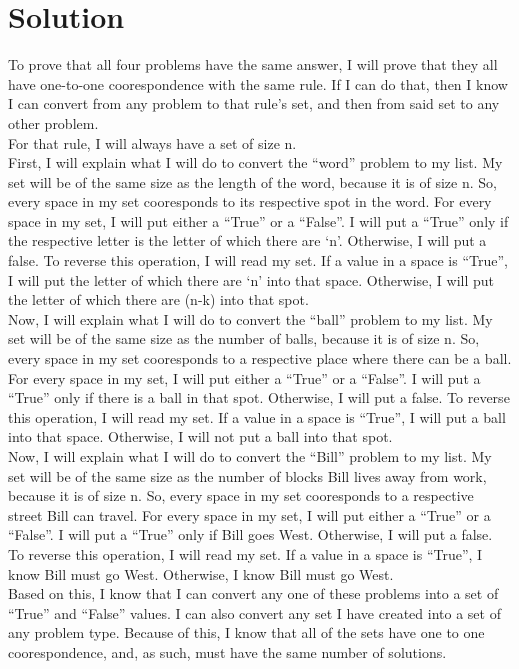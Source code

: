 \documentclass[11pt]{article} %
\newcommand\tab[1][1cm]{\hspace*{#1}}
\begin{document}
\section*{Solution}
\tab To prove that all four problems have the same answer, I will prove that they all have one-to-one coorespondence with the same rule. If I can do that, then I know I can convert from any problem to that rule's set, and then from said set to any other problem. 
\\ \tab For that rule, I will always have a set of size n.
\\ \tab First, I will explain what I will do to convert the ``word'' problem to my list. My set will be of the same size as the length of the word, because it is of size n. So, every space in my set cooresponds to its respective spot in the word. For every space in my set, I will put either a ``True'' or a ``False''. I will put a ``True'' only if the respective letter is the letter of which there are `n'. Otherwise, I will put a false. To reverse this operation, I will read my set. If a value in a space is ``True'', I will put the letter of which there are `n' into that space. Otherwise, I will put the letter of which there are (n-k) into that spot.
\\ \tab Now, I will explain what I will do to convert the ``ball'' problem to my list. My set will be of the same size as the number of balls, because it is of size n. So, every space in my set cooresponds to a respective place where there can be a ball. For every space in my set, I will put either a ``True'' or a ``False''. I will put a ``True'' only if there is a ball in that spot. Otherwise, I will put a false. To reverse this operation, I will read my set. If a value in a space is ``True'', I will put a ball into that space. Otherwise, I will not put a ball into that spot.
\\ \tab Now, I will explain what I will do to convert the ``Bill'' problem to my list. My set will be of the same size as the number of blocks Bill lives away from work, because it is of size n. So, every space in my set cooresponds to a respective street Bill can travel. For every space in my set, I will put either a ``True'' or a ``False''. I will put a ``True'' only if Bill goes West. Otherwise, I will put a false. To reverse this operation, I will read my set. If a value in a space is ``True'', I know Bill must go West. Otherwise, I know Bill must go West. 
\\ \tab Based on this, I know that I can convert any one of these problems into a set of ``True'' and ``False'' values. I can also convert any set I have created into a set of any problem type. Because of this, I know that all of the sets have one to one coorespondence, and, as such, must have the same number of solutions.
\end{document}
